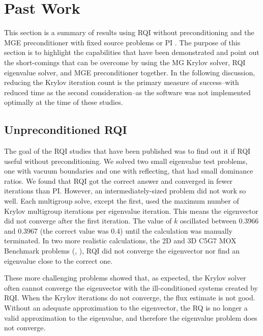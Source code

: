 \documentclass{article}                                                                           %
\begin{document}
\section{Past Work}
\label{sec:pastwork}
This section is a summary of results using RQI without preconditioning \cite{Slaybaugh2012} and the MGE preconditioner with fixed source problems or PI \cite{Slaybaugh2013}. The purpose of this section is to highlight the capabilities that have been demonstrated and point out the short-comings that can be overcome by using the MG Krylov solver, RQI eigenvalue solver, and MGE preconditioner together. In the following discussion, reducing the Krylov iteration count is the primary measure of success--with reduced time as the second consideration--as the software was not implemented optimally at the time of these studies. 

\subsection{Unpreconditioned RQI}
The goal of the RQI studies that have been published was to find out it if RQI useful without preconditioning. We solved two small eigenvalue test problems, one with vacuum boundaries and one with reflecting, that had small dominance ratios. We found that RQI got the correct answer and converged in fewer iterations than PI. However, an intermediately-sized problem did not work so well. Each multigroup solve, except the first, used the maximum number of Krylov multigroup iterations per eigenvalue iteration. This means the eigenvector did not converge after the first iteration. The value of $k$ oscillated between 0.3966 and 0.3967 (the correct value was 0.4) until the calculation was manually terminated. In two more realistic calculations, the 2D and 3D C5G7 MOX Benchmark problems (\cite{OECD-NEA2003}, \cite{OECD-NEA2005}), RQI did not converge the eigenvector nor find an eigenvalue close to the correct one. 

These more challenging problems showed that, as expected, the Krylov solver often cannot converge the eigenvector with the ill-conditioned systems created by RQI. When the Krylov iterations do not converge, the flux estimate is not good. Without an adequate approximation to the eigenvector, the RQ is no longer a valid approximation to the eigenvalue, and therefore the eigenvalue problem does not converge. 
\end{document}
